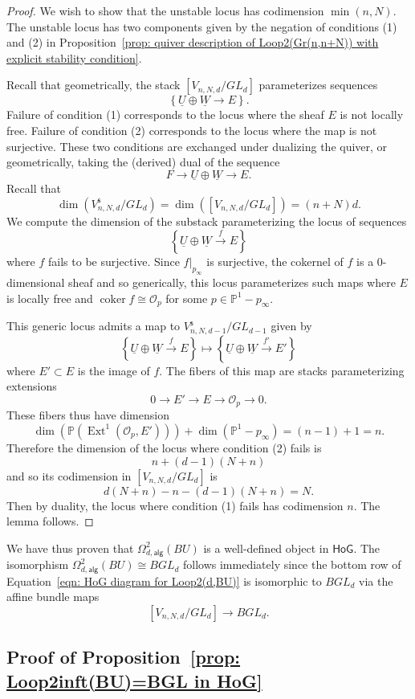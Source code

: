 \documentclass{amsart}
\theoremstyle{definition}
\newcommand{\HoG}{\textsf{HoG}}
\newcommand{\PP}{\mathbb{P}}
\newcommand{\OO}{\mathcal{O}}
\newcommand{\Ext}{\operatorname{Ext}}
\newcommand{\coker}{\operatorname{coker}}
\newcommand{\UL}[1]{\underline{#1}}
\newcommand{\alg}{\mathsf{alg}}
\newcommand{\stable}{\mathsf{s}}
\newcommand{\LoopTwo}{\Omega^{2}_{d,\alg}}
\begin{document}
\begin{proof}
We wish to show that the unstable locus has codimension
$\min(n,N)$. The unstable locus has two components given by the
negation of conditions (1) and (2) in Proposition~\ref{prop: quiver
description of Loop2(Gr(n,n+N)) with explicit stability condition}.

Recall that geometrically, the stack $\left[V_{n,N,d}/GL_{d} \right]$
parameterizes sequences
\[
\left\{\UL{U}\oplus \UL{W}\to E \right\}.
\]
Failure of condition (1) corresponds to the locus where the sheaf $E$
is not locally free. Failure of condition (2) corresponds to the locus
where the map is not surjective. These two conditions are exchanged
under dualizing the quiver, or geometrically, taking the (derived)
dual of the sequence 
\[
F\to \UL{U}\oplus \UL{W}\to E.
\]
Recall that 
\[
\dim (V^{\stable}_{n,N,d}/GL_{d}) = \dim (\left[V_{n,N,d}/GL_{d}
\right]) =  (n+N)d.
\]
We compute the dimension of the substack parameterizing the locus of
sequences 
\[
\left\{\UL{U}\oplus \UL{W}\xrightarrow{f}E \right\}
\]
where $f$ fails to be surjective. Since $f|_{p_{\infty}}$ is
surjective, the cokernel of $f$ is a 0-dimensional sheaf and so
generically, this locus parameterizes such maps where $E$ is locally
free and $\coker f \cong \OO_{p}$ for some $p\in \PP^{1}-p_{\infty}$.

This generic locus admits a map to
$V^{\stable}_{n,N,d-1}/GL_{d-1}$ given by 
\[
\left\{\UL{U}\oplus \UL{W}\xrightarrow{f}E \right\}\mapsto
\left\{\UL{U}\oplus \UL{W}\xrightarrow{f' }E' \right\}
\]
where $E'\subset E$ is the image of $f$. The fibers of this map are
stacks parameterizing extensions
\[
0\to E' \to E\to \OO_{p}\to 0.
\]
These fibers thus have dimension
\[
\dim (\PP (\Ext^{1}(\OO_{p},E'))) +\dim  (\PP^{1}-p_{\infty}) =
(n-1)+1 = n.
\]
Therefore the dimension of the locus where condition (2) fails is 
\[
n+(d-1)(N+n)
\]
and so its codimension in $\left[V_{n,N,d}/GL_{d} \right]$ is 
\[
d(N+n) - n -(d-1)(N+n) = N.
\]
Then by duality, the locus where condition (1) fails has codimension
$n$. The lemma follows.
\end{proof}

We have thus proven that $\LoopTwo (BU)$ is a well-defined object in
$\HoG$. The isomorphism $\LoopTwo (BU)\cong BGL_{d}$ follows
immediately since the bottom row of Equation~\eqref{eqn: HoG diagram
for Loop2(d,BU)} is isomorphic to $BGL_{d}$ via the affine bundle maps
\[
\left[V_{n,N,d}/GL_{d} \right] \to BGL_{d}.
\]

\subsection{Proof of Proposition~\ref{prop: Loop2inft(BU)=BGL in HoG}}
\end{document}
